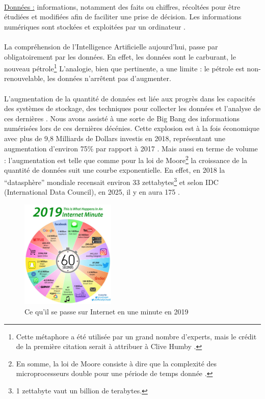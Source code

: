 \documentclass[10pt, french, a4paper]{report}
\begin{document}
\paragraph{}
\underline{Données :} informations, notamment des faits ou chiffres, récoltées pour être étudiées et modifiées afin de faciliter une prise de décision. Les informations numériques sont stockées et exploitées par un ordinateur \citep{cambridge_data_2020}.

\paragraph{}
La compréhension de l'Intelligence Artificielle aujourd'hui, passe par obligatoirement par les données. En effet, les données sont le carburant, le nouveau pétrole\footnote{Cette métaphore a été utilisée par un grand nombre d'experts, mais le crédit de la première citation serait à attribuer à Clive Humby \citep{haupt_who_2006}.} L'analogie, bien que pertinente, a une limite : le pétrole est non-renouvelable, les données n'arrêtent pas d'augmenter.

\paragraph{}
L'augmentation de la quantité de données est liée aux progrès dans les capacités des systèmes de stockage, des techniques pour collecter les données et l'analyse de ces dernières \citep{press_very_2013}. Nous avons assisté à une sorte de Big Bang des informations numérisées lors de ces dernières décénies. Cette explosion est à la fois économique avec plus de 9,8 Milliards de Dollars investis en 2018, représentant une augmentation d'environ 75\% par rapport à 2017 \citep{columbus_25_2019}. Mais aussi en terme de volume : l'augmentation est telle que comme pour la loi de Moore\footnote{En somme, la loi de Moore consiste à dire que la complexité des microprocesseurs double pour une période de temps donnée \citep{moore_cramming_1998}.} la croissance de la quantité de données suit une courbe exponentielle. En effet, en 2018 la ``datasphère'' mondiale recensait environ 33 zettabytes\footnote{1 zettabyte vaut un billion de terabytes.} et selon IDC (International Data Council), en 2025, il y en aura 175 \citep{reinsel_digitization_2018}.

\begin{figure}[hbt!]
  \centering
  \includegraphics[width=0.4\textwidth]{images/internet-minute-2019.jpg}
  \caption{Ce qu'il se passe sur Internet en une minute en 2019 \citep{desjardins_what_2019}}
  \label{fig:internet_minute_2019}
\end{figure}
\end{document}
